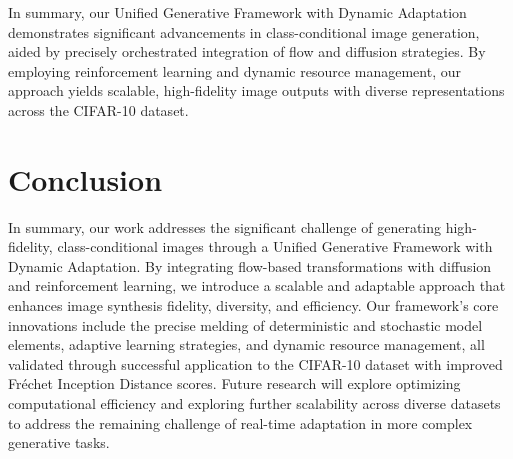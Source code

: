 \documentclass{article} %
\begin{document}
In summary, our Unified Generative Framework with Dynamic Adaptation demonstrates significant advancements in class-conditional image generation, aided by precisely orchestrated integration of flow and diffusion strategies. By employing reinforcement learning and dynamic resource management, our approach yields scalable, high-fidelity image outputs with diverse representations across the CIFAR-10 dataset.


\section{Conclusion}

In summary, our work addresses the significant challenge of generating high-fidelity, class-conditional images through a Unified Generative Framework with Dynamic Adaptation. By integrating flow-based transformations with diffusion and reinforcement learning, we introduce a scalable and adaptable approach that enhances image synthesis fidelity, diversity, and efficiency. Our framework's core innovations include the precise melding of deterministic and stochastic model elements, adaptive learning strategies, and dynamic resource management, all validated through successful application to the CIFAR-10 dataset with improved Fréchet Inception Distance scores. Future research will explore optimizing computational efficiency and exploring further scalability across diverse datasets to address the remaining challenge of real-time adaptation in more complex generative tasks.





\end{document}
